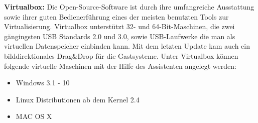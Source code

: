 \textbf{Virtualbox:} Die Open-Source-Software ist durch ihre umfangreiche Ausstattung sowie ihrer 
guten Bedienerführung eines der meisten benutzten Tools zur Virtualisierung. Virtualbox unterstützt 32- 
und 64-Bit-Maschinen, die zwei gängingsten USB Standards 2.0 und 3.0, sowie USB-Laufwerke die man als 
virtuellen Datenspeicher einbinden kann. Mit dem letzten Update kam auch ein bilddirektionales Drag\&Drop 
für die Gastsysteme. Unter Virtualbox können folgende virtuelle Maschinen mit der Hilfe des Assistenten 
angelegt werden:
\begin{itemize}
        \item Windows 3.1 - 10
        \item Linux Distributionen ab dem Kernel 2.4
        \item MAC OS X
\end{itemize} 


 
